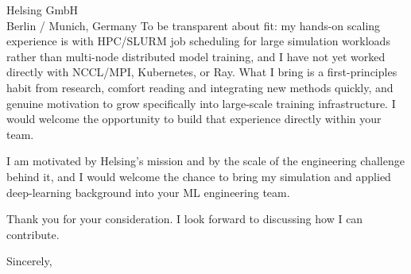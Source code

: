 \documentclass[10pt]{letter}
\begin{document}
\begin{letter}{Helsing GmbH \\ Berlin / Munich, Germany}
To be transparent about fit: my hands-on scaling experience is with HPC/SLURM job scheduling for large simulation workloads rather than multi-node distributed model training, and I have not yet worked directly with NCCL/MPI, Kubernetes, or Ray. What I bring is a first-principles habit from research, comfort reading and integrating new methods quickly, and genuine motivation to grow specifically into large-scale training infrastructure. I would welcome the opportunity to build that experience directly within your team.

I am motivated by Helsing's mission and by the scale of the engineering challenge behind it, and I would welcome the chance to bring my simulation and applied deep-learning background into your ML engineering team.

Thank you for your consideration. I look forward to discussing how I can contribute.

\closing{Sincerely,}
\end{letter}
\end{document}

